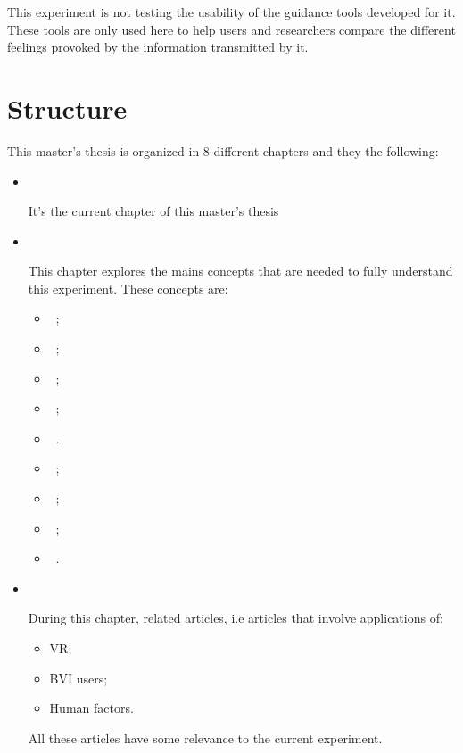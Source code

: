 
This experiment is not testing the usability of the guidance tools developed for it. These tools are only used here to help users and researchers compare the different feelings provoked by the information transmitted by it.


\section{Structure}

This master's thesis is organized in 8 different chapters and they the following:

\begin{itemize}
    \item {\large\textbf{{~}}}
        
        It's the current chapter of this master's thesis
    
    \item {\large\textbf{{~}}}
    
        This chapter explores the mains concepts that are needed to fully understand this experiment. These concepts are:
        
        \begin{itemize}
            \item {~};
            \item {~};
            \item {~};
            \item {~};
            \item {~}.
            \item {~};
            \item {~};
            \item {~};
            \item {~}.
            
        \end{itemize}
    
    \item {\large\textbf{{~}}}
    
        During this chapter, related articles, i.e articles that involve applications of:
        \begin{itemize}
            \item VR;
            \item BVI users;
            \item Human factors.
        \end{itemize}
        All these articles have some relevance to the current experiment.
    

\end{itemize}
